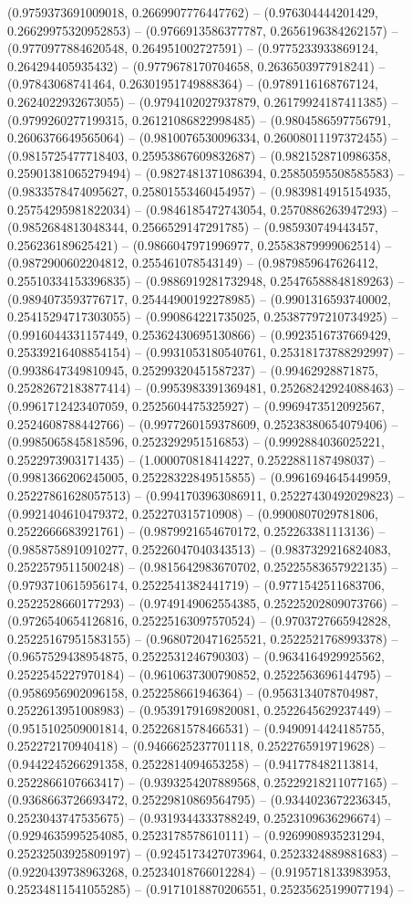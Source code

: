 (0.9759373691009018, 0.2669907776447762) -- (0.976304444201429, 0.26629975320952853) -- (0.9766913586377787, 0.2656196384262157) -- (0.9770977884620548, 0.264951002727591) -- (0.9775233933869124, 0.264294405935432) -- (0.9779678170704658, 0.2636503977918241) -- (0.97843068741464, 0.26301951749888364) -- (0.9789116168767124, 0.2624022932673055) -- (0.9794102027937879, 0.26179924187411385) -- (0.9799260277199315, 0.26121086822998485) -- (0.9804586597756791, 0.2606376649565064) -- (0.9810076530096334, 0.26008011197372455) -- (0.9815725477718403, 0.25953867609832687) -- (0.9821528710986358, 0.25901381065279494) -- (0.9827481371086394, 0.25850595508585583) -- (0.9833578474095627, 0.25801553460454957) -- (0.9839814915154935, 0.25754295981822034) -- (0.9846185472743054, 0.2570886263947293) -- (0.9852684813048344, 0.2566529147291785) -- (0.985930749443457, 0.256236189625421) -- (0.9866047971996977, 0.25583879999062514) -- (0.9872900602204812, 0.255461078543149) -- (0.9879859647626412, 0.25510334153396835) -- (0.9886919281732948, 0.25476588848189263) -- (0.9894073593776717, 0.25444900192278985) -- (0.9901316593740002, 0.25415294717303055) -- (0.990864221735025, 0.25387797210734925) -- (0.9916044331157449, 0.25362430695130866) -- (0.9923516737669429, 0.25339216408854154) -- (0.9931053180540761, 0.25318173788292997) -- (0.9938647349810945, 0.25299320451587237) -- (0.99462928871875, 0.25282672183877414) -- (0.9953983391369481, 0.25268242924088463) -- (0.9961712423407059, 0.2525604475325927) -- (0.9969473512092567, 0.2524608788442766) -- (0.9977260159378609, 0.25238380654079406) -- (0.9985065845818596, 0.2523292951516853) -- (0.9992884036025221, 0.2522973903171435) -- (1.000070818414227, 0.2522881187498037) -- (0.9981366206245005, 0.25228322849515855) -- (0.9961694645449959, 0.25227861628057513) -- (0.9941703963086911, 0.25227430492029823) -- (0.9921404610479372, 0.252270315710908) -- (0.9900807029781806, 0.2522666683921761) -- (0.9879921654670172, 0.252263381113136) -- (0.9858758910910277, 0.25226047040343513) -- (0.9837329216824083, 0.2522579511500248) -- (0.9815642983670702, 0.25225583657922135) -- (0.9793710615956174, 0.2522541382441719) -- (0.9771542511683706, 0.2522528660177293) -- (0.9749149062554385, 0.25225202809073766) -- (0.9726540654126816, 0.25225163097570524) -- (0.9703727665942828, 0.25225167951583155) -- (0.9680720471625521, 0.2522521768993378) -- (0.9657529438954875, 0.2522531246790303) -- (0.9634164929925562, 0.2522545227970184) -- (0.9610637300790852, 0.2522563696144795) -- (0.9586956902096158, 0.252258661946364) -- (0.9563134078704987, 0.2522613951008983) -- (0.9539179169820081, 0.2522645629237449) -- (0.9515102509001814, 0.2522681578466531) -- (0.9490914424185755, 0.252272170940418) -- (0.9466625237701118, 0.2522765919719628) -- (0.9442245266291358, 0.2522814094653258) -- (0.941778482113814, 0.2522866107663417) -- (0.9393254207889568, 0.25229218211077165) -- (0.9368663726693472, 0.25229810869564795) -- (0.9344023672236345, 0.2523043747535675) -- (0.9319344333788249, 0.2523109636296674) -- (0.9294635995254085, 0.2523178578610111) -- (0.9269908935231294, 0.25232503925809197) -- (0.9245173427073964, 0.2523324889881683) -- (0.9220439738963268, 0.25234018766012284) -- (0.9195718133983953, 0.25234811541055285) -- (0.9171018870206551, 0.25235625199077194) -- 